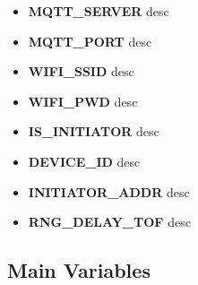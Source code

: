 \begin{itemize}
	\item \textbf{MQTT\_SERVER}
	\newline
	desc
	
	\item \textbf{MQTT\_PORT}
	\newline
	desc
	
	\item \textbf{WIFI\_SSID}
	\newline
	desc
	
	\item \textbf{WIFI\_PWD}
	\newline
	desc
	
	\item \textbf{IS\_INITIATOR}
	\newline
	desc
	
	\item \textbf{DEVICE\_ID}
	\newline
	desc
	
	\item \textbf{INITIATOR\_ADDR}
	\newline
	desc
	
	\item \textbf{RNG\_DELAY\_TOF}
	\newline
	desc
\end{itemize}

\subsection{Main Variables}

